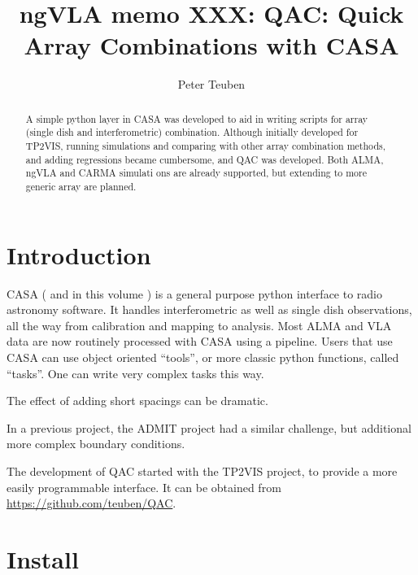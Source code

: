 \documentclass[11pt,twoside]{article}
\begin{document}
\title{ngVLA memo XXX: QAC: Quick Array Combinations with CASA}
\author{Peter Teuben
  }



\begin{abstract}

A simple python layer in CASA was developed to aid in writing scripts
for array (single dish and interferometric) combination. Although
initially developed for TP2VIS, running simulations and comparing
with other array combination methods, and adding regressions became
cumbersome, and QAC was developed. Both ALMA, ngVLA and CARMA simulati
ons are already supported, but extending to more generic array are
planned.

\end{abstract}




\section{Introduction}

CASA (\citet{casa1} and in this volume \citet{casa2}) 
is a general purpose python interface to radio
astronomy software. It handles interferometric as well as single dish
observations, all the way from calibration and mapping to
analysis. Most ALMA and VLA data are now routinely processed with CASA
using a pipeline.  Users that use CASA can use object oriented
``tools'', or more classic python functions, called
``tasks''. One can write very complex tasks this way.

The effect of adding short spacings can be dramatic.

In a previous project, the ADMIT project had a similar challenge, but
additional more complex boundary conditions.

The development of QAC started with the TP2VIS project, to provide a
more easily programmable interface. It can be obtained from
\url{https://github.com/teuben/QAC}.

\section{Install}
\end{document}
